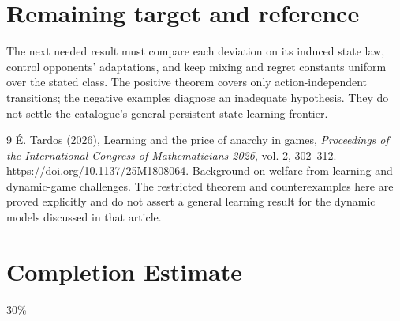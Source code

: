 \documentclass[11pt,a4paper]{article}
\theoremstyle{definition}
\theoremstyle{remark}
\begin{document}
\section{Remaining target and reference}
The next needed result must compare each deviation on its induced state law, control opponents' adaptations, and keep mixing and regret constants uniform over the stated class. The positive theorem covers only action-independent transitions; the negative examples diagnose an inadequate hypothesis. They do not settle the catalogue's general persistent-state learning frontier.
\begin{thebibliography}{9}
 \'E. Tardos (2026), Learning and the price of anarchy in games, \emph{Proceedings of the International Congress of Mathematicians 2026}, vol. 2, 302--312. \url{https://doi.org/10.1137/25M1808064}. Background on welfare from learning and dynamic-game challenges. The restricted theorem and counterexamples here are proved explicitly and do not assert a general learning result for the dynamic models discussed in that article.
\end{thebibliography}

\section{Completion Estimate}
30\%
\end{document}
